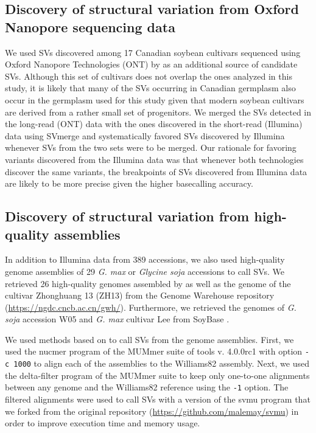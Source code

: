 \documentclass[12pt]{report}
\begin{document}
\subsection*{Discovery of structural variation from Oxford Nanopore sequencing data}
\label{sv-gwas-sv-discovery-ont}

We used SVs discovered among 17 Canadian soybean cultivars sequenced using
Oxford Nano\-pore Technologies (ONT) by \cite{lemay2022} as an additional
source of candidate SVs. Although this set of cultivars does not overlap the
ones analyzed in this study, it is likely that many of the SVs occurring
in Canadian germplasm also occur in the germplasm used for this study given that modern soybean
cultivars are derived from a rather small set of progenitors. We merged the SVs detected in the
long-read (ONT) data with the ones discovered in the short-read (Illumina) data
using SVmerge and systematically favored SVs discovered by Illumina whenever
SVs from the two sets were to be merged.  Our rationale for favoring variants
discovered from the Illumina data was that whenever both technologies discover
the same variants, the breakpoints of SVs discovered from Illumina data are
likely to be more precise given the higher basecalling accuracy.

\subsection*{Discovery of structural variation from high-quality assemblies}
\label{sv-gwas-sv-discovery-assembly}

In addition to Illumina data from 389 accessions, we also used
high-quality genome assemblies of 29 \emph{G. max} or \emph{Glycine soja}
accessions to call SVs. We
retrieved 26 high-quality genomes assembled by \cite{liu2020-pangenome} as well
as the genome of the cultivar Zhonghuang 13 (ZH13) from the Genome Warehouse
repository (\url{https://ngdc.cncb.ac.cn/gwh/}). Furthermore, we retrieved the genomes
of \emph{G. soja} accession W05 and \emph{G. max} cultivar Lee from SoyBase
\citep{grant2010}.

We used methods based on \cite{liu2020-pangenome} to call SVs from the
genome assemblies.  First, we used the nucmer program of the MUMmer suite of
tools v. 4.0.0rc1 \citep{marcais2018} with option \texttt{-c 1000} to align
each of the assemblies to the Williams82 assembly. Next, we used the
delta-filter program of the MUMmer suite to keep only one-to-one alignments
between any genome and the Williams82 reference using the \texttt{-1} option.
The filtered alignments were used to call SVs with a version of the svmu
program \citep{chakraborty2019} that we forked from the original repository
(\url{https://github.com/malemay/svmu}) in order to improve execution time and
memory usage.
\end{document}
